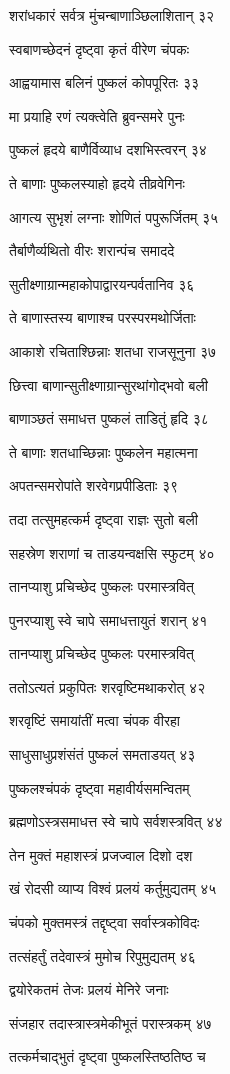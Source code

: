 शरांधकारं सर्वत्र मुंचन्बाणाञ्छिलाशितान् ३२

स्वबाणच्छेदनं दृष्ट्वा कृतं वीरेण चंपकः

आह्वयामास बलिनं पुष्कलं कोपपूरितः ३३

मा प्रयाहि रणं त्यक्त्वेति ब्रुवन्समरे पुनः

पुष्कलं हृदये बाणैर्विव्याध दशभिस्त्वरन् ३४

ते बाणाः पुष्कलस्याहो हृदये तीव्रवेगिनः

आगत्य सुभृशं लग्नाः शोणितं पपुरूर्जितम् ३५

तैर्बाणैर्व्यथितो वीरः शरान्पंच समाददे

सुतीक्ष्णाग्रान्महाकोपाद्वारयन्पर्वतानिव ३६

ते बाणास्तस्य बाणाश्च परस्परमथोर्जिताः

आकाशे रचिताश्छिन्नाः शतधा राजसूनुना ३७

छित्त्वा बाणान्सुतीक्ष्णाग्रान्सुरथांगोद्भवो बली

बाणाञ्छतं समाधत्त पुष्कलं ताडितुं हृदि ३८

ते बाणाः शतधाच्छिन्नाः पुष्कलेन महात्मना

अपतन्समरोपांते शरवेगप्रपीडिताः ३९

तदा तत्सुमहत्कर्म दृष्ट्वा राज्ञः सुतो बली

सहस्रेण शराणां च ताडयन्वक्षसि स्फुटम् ४०

तानप्याशु प्रचिच्छेद पुष्कलः परमास्त्रवित्

पुनरप्याशु स्वे चापे समाधत्तायुतं शरान् ४१

तानप्याशु प्रचिच्छेद पुष्कलः परमास्त्रवित्

ततोऽत्यतं प्रकुपितः शरवृष्टिमथाकरोत् ४२

शरवृष्टिं समायांतीं मत्वा चंपक वीरहा

साधुसाधुप्रशंसंतं पुष्कलं समताडयत् ४३

पुष्कलश्चंपकं दृष्ट्वा महावीर्यसमन्वितम्

ब्रह्मणोऽस्त्रसमाधत्त स्वे चापे सर्वशस्त्रवित् ४४

तेन मुक्तं महाशस्त्रं प्रजज्वाल दिशो दश

खं रोदसी व्याप्य विश्वं प्रलयं कर्तुमुद्यतम् ४५

चंपको मुक्तमस्त्रं तद्दृष्ट्वा सर्वास्त्रकोविदः

तत्संहर्तुं तदेवास्त्रं मुमोच रिपुमुद्यतम् ४६

द्वयोरेकतमं तेजः प्रलयं मेनिरे जनाः

संजहार तदास्त्रास्त्रमेकीभूतं परास्त्रकम् ४७

तत्कर्मचाद्भुतं दृष्ट्वा पुष्कलस्तिष्ठतिष्ठ च


